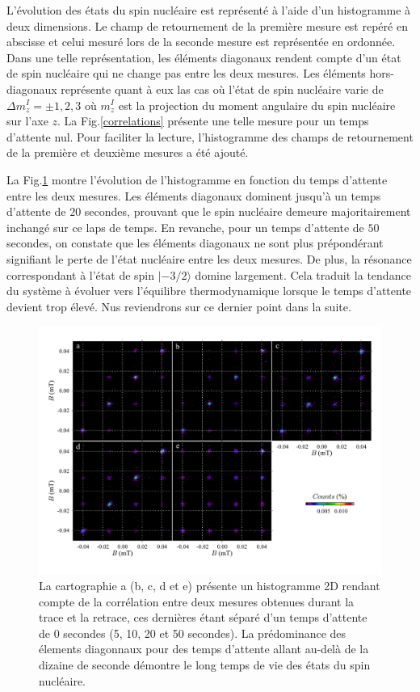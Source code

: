L'évolution des états du spin nucléaire est représenté à l'aide d'un histogramme à deux dimensions. Le champ de retournement de la première mesure est repéré en abscisse et celui mesuré lors de la seconde mesure est représentée en ordonnée. Dans une telle représentation, les éléments diagonaux rendent compte d'un état de spin nucléaire qui ne change pas entre les deux mesures. Les éléments hors-diagonaux représente quant à eux las cas où l'état de spin nucléaire varie de $\Delta m_z^I = \pm 1,2,3$ où $m_z^I$ est la projection du moment angulaire du spin nucléaire sur l'axe $z$. La Fig.\ref{correlations} présente une telle mesure pour un temps d'attente nul. Pour faciliter la lecture, l'histogramme des champs de retournement de la première et deuxième mesures a été ajouté.

La Fig.\ref{evolution_temps} montre l'évolution de l'histogramme en fonction du temps d'attente entre les deux mesures. Les éléments diagonaux dominent jusqu'à un temps d'attente de $20$ secondes, prouvant que le spin nucléaire demeure majoritairement inchangé sur ce laps de temps. En revanche, pour un temps d'attente de $50$ secondes, on constate que les éléments diagonaux ne sont plus prépondérant signifiant le perte de l'état nucléaire entre les deux mesures. De plus, la résonance correspondant à l'état de spin $|-3/2 \rangle$ domine largement. Cela traduit la tendance du système à évoluer vers l'équilibre thermodynamique lorsque le temps d'attente devient trop élevé. Nus reviendrons sur ce dernier point dans la suite.

\begin{figure}[h]
\includegraphics[scale=0.45]{Resultats/HistTime/HistTime.pdf} 
\caption{La cartographie a (b, c, d et e) présente un histogramme 2D rendant compte de la corrélation entre deux mesures obtenues durant la trace et la retrace, ces dernières étant séparé d'un temps d'attente de 0 secondes (5, 10, 20 et 50 secondes). La prédominance des élements diagonnaux pour des temps d'attente allant au-delà de la dizaine de seconde démontre le long temps de vie des états du spin nucléaire.}
\label{evolution_temps}
\end{figure}

